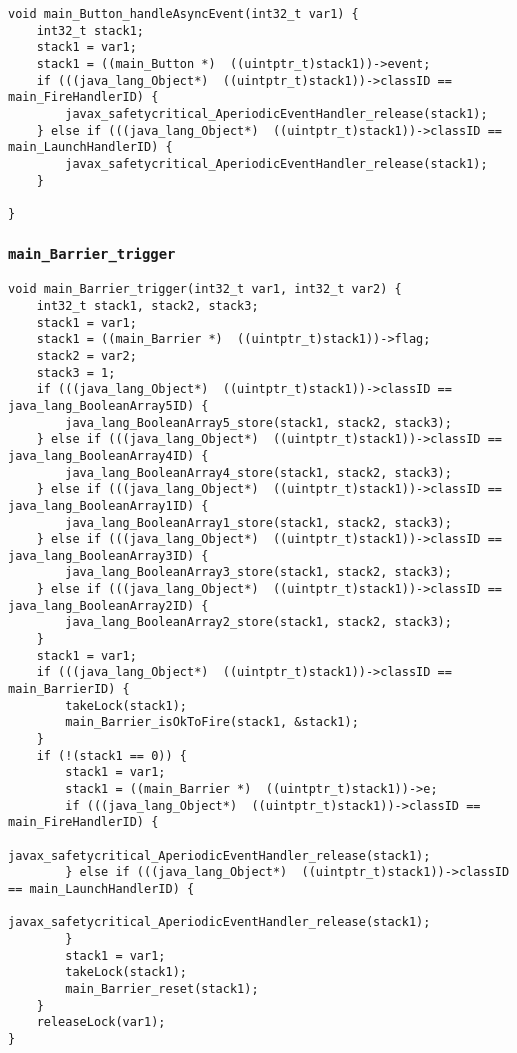 \begin{landscape}
\begin{multicols}{2}
\begin{lstlisting}[firstnumber=1765]
void main_Button_handleAsyncEvent(int32_t var1) {
	int32_t stack1;
	stack1 = var1;
	stack1 = ((main_Button *)  ((uintptr_t)stack1))->event;
	if (((java_lang_Object*)  ((uintptr_t)stack1))->classID == main_FireHandlerID) {
		javax_safetycritical_AperiodicEventHandler_release(stack1);
	} else if (((java_lang_Object*)  ((uintptr_t)stack1))->classID == main_LaunchHandlerID) {
		javax_safetycritical_AperiodicEventHandler_release(stack1);
	}

}
\end{lstlisting}

\subsubsection{\texttt{main\_Barrier\_trigger}}

\begin{lstlisting}[firstnumber=1803]
void main_Barrier_trigger(int32_t var1, int32_t var2) {
	int32_t stack1, stack2, stack3;
	stack1 = var1;
	stack1 = ((main_Barrier *)  ((uintptr_t)stack1))->flag;
	stack2 = var2;
	stack3 = 1;
	if (((java_lang_Object*)  ((uintptr_t)stack1))->classID == java_lang_BooleanArray5ID) {
		java_lang_BooleanArray5_store(stack1, stack2, stack3);
	} else if (((java_lang_Object*)  ((uintptr_t)stack1))->classID == java_lang_BooleanArray4ID) {
		java_lang_BooleanArray4_store(stack1, stack2, stack3);
	} else if (((java_lang_Object*)  ((uintptr_t)stack1))->classID == java_lang_BooleanArray1ID) {
		java_lang_BooleanArray1_store(stack1, stack2, stack3);
	} else if (((java_lang_Object*)  ((uintptr_t)stack1))->classID == java_lang_BooleanArray3ID) {
		java_lang_BooleanArray3_store(stack1, stack2, stack3);
	} else if (((java_lang_Object*)  ((uintptr_t)stack1))->classID == java_lang_BooleanArray2ID) {
		java_lang_BooleanArray2_store(stack1, stack2, stack3);
	}
	stack1 = var1;
	if (((java_lang_Object*)  ((uintptr_t)stack1))->classID == main_BarrierID) {
		takeLock(stack1);
		main_Barrier_isOkToFire(stack1, &stack1);
	}
	if (!(stack1 == 0)) {
		stack1 = var1;
		stack1 = ((main_Barrier *)  ((uintptr_t)stack1))->e;
		if (((java_lang_Object*)  ((uintptr_t)stack1))->classID == main_FireHandlerID) {
			javax_safetycritical_AperiodicEventHandler_release(stack1);
		} else if (((java_lang_Object*)  ((uintptr_t)stack1))->classID == main_LaunchHandlerID) {
			javax_safetycritical_AperiodicEventHandler_release(stack1);
		}
		stack1 = var1;
		takeLock(stack1);
		main_Barrier_reset(stack1);
	}
	releaseLock(var1);
}
\end{lstlisting}



\end{multicols}
\end{landscape}
